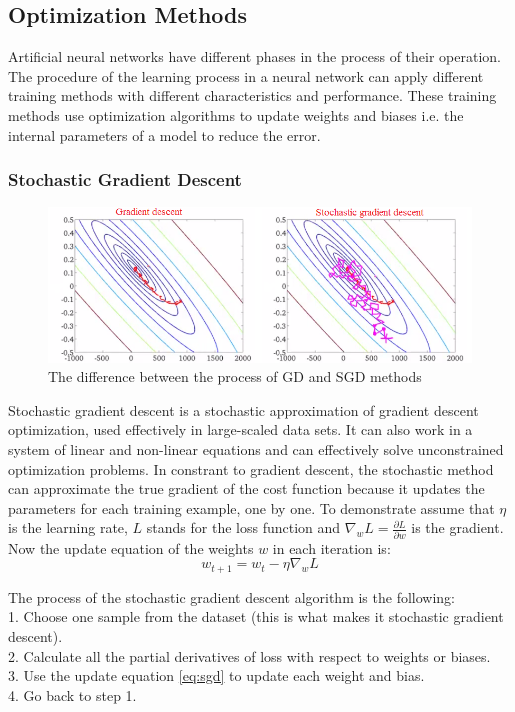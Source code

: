\subsection{Optimization Methods}

Artificial neural networks have different phases in the process of their operation. The procedure of the learning process in a neural network can apply different training methods with different characteristics and performance. These training methods use optimization algorithms to update weights and biases i.e. the internal parameters of a model to reduce the error. \cite{veerarajan2007numerical}\cite{pillo2013nonlinear}



\subsubsection{Stochastic Gradient Descent}

\begin{figure}[h]
	\centering
	\includegraphics[height=0.28\linewidth]{./figures/stochastic}
	\caption{The difference between the process of GD and SGD methods}
	\label{fig:stochastic}
\end{figure}
Stochastic gradient descent \cite{Bottou2012} is a stochastic approximation of gradient descent optimization, used effectively in large-scaled data sets. It can also work in a system of linear and non-linear equations and can effectively solve unconstrained optimization problems. In constrant to gradient descent, the stochastic method can approximate the true gradient of the cost function because it updates the parameters for each training example, one by one. To demonstrate assume that $\eta$ is the learning rate, $L$ stands for the loss function and $\nabla_w L = \frac{\partial L}{\partial w}$ is the gradient. Now the update equation of the weights $w$ in each iteration is:
\begin{equation} w_{t+1} = w_t - \eta \nabla_w L \label{eq:sgd} \end{equation} 

\noindent The process of the stochastic gradient descent algorithm is the following:\\
1. Choose one sample from the dataset (this is what makes it stochastic gradient descent).\\
2. Calculate all the partial derivatives of loss with respect to weights or biases. \\
3. Use the update equation \eqref{eq:sgd} to update each weight and bias.\\
4. Go back to step 1.


